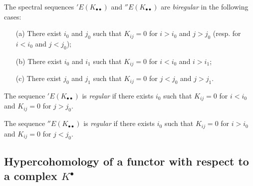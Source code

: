 \begin{env}[11.3.6]
\label{0.11.3.6}
The spectral sequences $'E(K_{\bullet\bullet})$ and $''E(K_{\bullet\bullet})$ are \emph{biregular} in the following cases:
\begin{enumerate}
  \item[(a)] There exist $i_0$ and $j_0$ such that $K_{ij}=0$ for $i>i_0$ and $j>j_0$ (resp. for $i<i_0$ and $j<j_0$);
  \item[(b)] There exist $i_0$ and $i_1$ such that $K_{ij}=0$ for $i<i_0$ and $i>i_1$;
  \item[(c)] There exist $j_0$ and $j_1$ such that $K_{ij}=0$ for $j<j_0$ and $j>j_1$.
\end{enumerate}

The sequence $'E(K_{\bullet\bullet})$ is \emph{regular} if there exists $i_0$ such that $K_{ij}=0$ for $i<i_0$ and $K_{ij}=0$ for $j>j_0$.

The sequence $''E(K_{\bullet\bullet})$ is \emph{regular} if there exists $i_0$ such that $K_{ij}=0$ for $i>i_0$ and $K_{ij}=0$ for $j<j_0$.
\end{env}


\subsection{Hypercohomology of a functor with respect to a complex $K^{\bullet}$}
\label{subsection:0.11.4}

